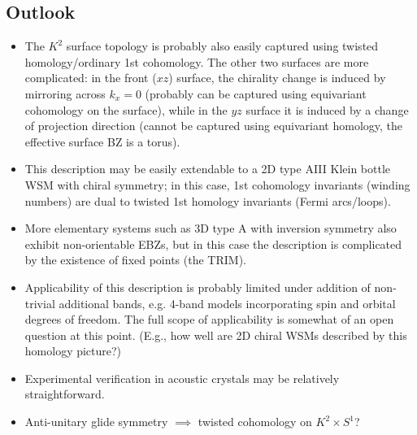 \subsection{Outlook}

{\color{blue}
\begin{itemize}
	\item The $K^2$ surface topology is probably also easily captured using twisted homology/ordinary 1st cohomology. The other two surfaces are more complicated: in the front ($xz$) surface, the chirality change is induced by mirroring across $k_x=0$ (probably can be captured using equivariant cohomology on the surface), while in the $yz$ surface it is induced by a change of projection direction (cannot be captured using equivariant homology, the effective surface BZ is a torus).
	
	\item This description may be easily extendable to a 2D type AIII Klein bottle WSM with chiral symmetry; in this case, 1st cohomology invariants (winding numbers) are dual to twisted 1st homology invariants (Fermi arcs/loops).
	
	\item More elementary systems such as 3D type A with inversion symmetry also exhibit non-orientable EBZs, but in this case the description is complicated by the existence of fixed points (the TRIM).
	
	\item Applicability of this description is probably limited under addition of non-trivial additional bands, e.g. 4-band models incorporating spin and orbital degrees of freedom. The full scope of applicability is somewhat of an open question at this point. (E.g., how well are 2D chiral WSMs described by this homology picture?)
	
	\item Experimental verification in acoustic crystals may be relatively straightforward.
	
	\item Anti-unitary glide symmetry $\implies$ twisted cohomology on $K^2\times S^1$?
\end{itemize}
}



